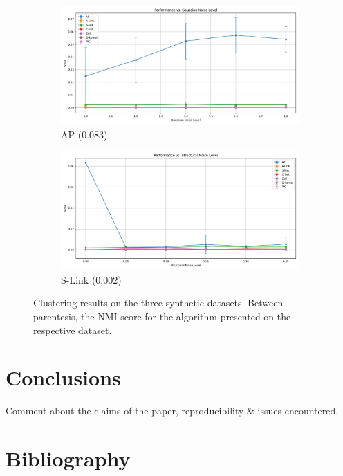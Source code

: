 \documentclass[
	10pt,
	parskip=half-,	
	paper=a4,
	english
	]{scrartcl}
\begin{document}
\begin{figure}[h!]
    \begin{subfigure}[b]{0.45\textwidth}
        \includegraphics[width=\textwidth]{../data/plots/results_gaussian_noise_circles.png}
        \caption{AP (0.083)}
    \end{subfigure}
    \begin{subfigure}[b]{0.45\textwidth}
        \includegraphics[width=\textwidth]{../data/plots/results_structural_noise_circles.png}
        \caption{S-Link (0.002)}
    \end{subfigure}

    \caption{Clustering results on the three synthetic datasets. Between parentesis, the NMI score for the algorithm presented on the respective dataset.}
    \label{fig:noise_analysis}
\end{figure}

\section{Conclusions}

Comment about the claims of the paper, reproducibility \& issues encountered.

\newpage
\section{Bibliography}
\end{document}
